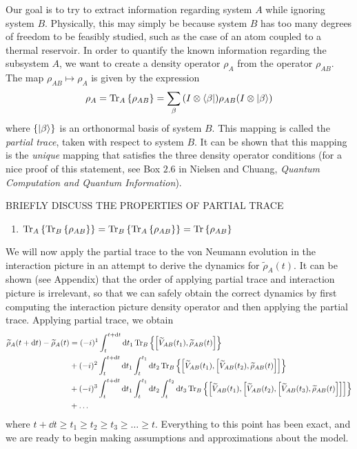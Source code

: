 \documentclass{article}
\newcommand{\ten}{\otimes}
\newcommand{\Tra}[1]{\Tr\left\{#1\right\}}
\newcommand{\Ptra}[2]{\Tr_{#1}\left\{#2\right\}}
\newcommand{\til}[1]{\widetilde{#1}}
\begin{document}
Our goal is to try to extract information regarding system $A$ while ignoring system $B$. Physically, this may simply be because system $B$ has too many degrees of freedom to be feasibly studied, such as the case of an atom coupled to a thermal reservoir. In order to quantify the known information regarding the subsystem $A$, we want to create a density operator $\rho_A$ from the operator $\rho_{AB}$. The map $\rho_{AB}\mapsto\rho_A$ is given by the expression
\begin{equation}\label{ptra}
\rho_A = \Ptra{A}{\rho_{AB}}=\sum_{\beta}\qty(I\ten\bra{\beta})\rho_{AB}\qty(I\ten\ket{\beta})
\end{equation}
where $\{\ket{\beta}\}$ is an orthonormal basis of system $B$. This mapping is called the \textit{partial trace}, taken with respect to system $B$. It can be shown that this mapping is the \textit{unique} mapping that satisfies the three density operator conditions (for a nice proof of this statement, see Box $2.6$ in Nielsen and Chuang, \textit{Quantum Computation and Quantum Information}).

BRIEFLY DISCUSS THE PROPERTIES OF PARTIAL TRACE
\begin{enumerate}
	\item $\Ptra{A}{\Ptra{B}{\rho_{AB}}} = \Ptra{B}{\Ptra{A}{\rho_{AB}}} = \Tra{\rho_{AB}}$
\end{enumerate}

We will now apply the partial trace to the von Neumann evolution in the interaction picture in an attempt to derive the dynamics for $\til{\rho}_A(t)$. It can be shown (see Appendix) that the order of applying partial trace and interaction picture is irrelevant, so that we can safely obtain the correct dynamics by first computing the interaction picture density operator and then applying the partial trace. Applying partial trace, we obtain
\begin{align}\label{partintpert}
\begin{split}
\til{\rho}_{A}(t+\dd{t}) - \til{\rho}_{A}(t) &= (-i)^1\int_t^{t+\dd{t}}\dd{t_1}\Ptra{B}{\comm{\til{V}_{AB}(t_1)}{\til{\rho}_{AB}(t)}}\\
&+(-i)^2\int_t^{t+\dd{t}}\dd{t_1}\int_t^{t_1}\dd{t_2}\Ptra{B}{\comm{\til{V}_{AB}(t_1)}{\comm{\til{V}_{AB}(t_2)}{\til{\rho}_{AB}(t)}}}\\
&+(-i)^3\int_t^{t+\dd{t}}\dd{t_1}\int_t^{t_1}\dd{t_2}\int_t^{t_2}\dd{t_3}\Ptra{B}{\comm{\til{V}_{AB}(t_1)}{\comm{\til{V}_{AB}(t_2)}{\comm{\til{V}_{AB}(t_3)}{\til{\rho}_{AB}(t)}}}}\\
&+\ldots
\end{split}
\end{align}
where $t+\dd{t}\geq t_1\geq t_2\geq t_3\geq \ldots\geq t$. Everything to this point has been exact, and we are ready to begin making assumptions and approximations about the model.
\end{document}
